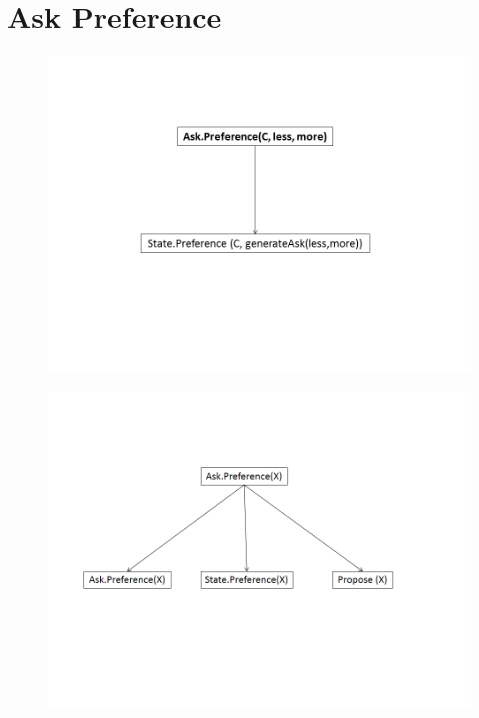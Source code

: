 \documentclass{llncs}
\begin{document}
\section{Ask Preference}
\begin{figure} [t]
	\centerline{\includegraphics[width=5in]{utterances/Diapositive1.PNG}}
	\vskip 8pt
\end{figure}
\begin{figure}
\centerline{\includegraphics[width=5in]{figs/ask.PNG}}

\end{figure}
\end{document}
